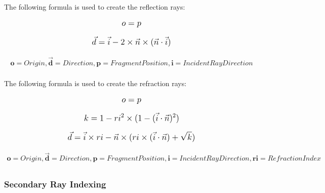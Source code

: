 The following formula is used to create the reflection rays:

\begin{equation}
    \mathlarger{o = p}
\end{equation}

\begin{equation}
    \mathlarger{\vec{d} = \vec{i} - 2 \times \vec{n} \times (\vec{n} \cdot \vec{i})}
\end{equation}

\begin{align*}
    \textbf{o} = Origin, \mathbf{\vec{d}} = Direction,                     
    \textbf{p} = Fragment Position,
    \textbf{i} = Incident Ray Direction\\
\end{align*}


The following formula is used to create the refraction rays:

\begin{equation}
    \mathlarger{o = p}
\end{equation}  

\begin{equation}
    \mathlarger{k = 1 - ri^{2} \times (1 - (\vec{i} \cdot \vec{n})^{2})}
\end{equation}  

\begin{equation}
    \mathlarger{\vec{d} = \vec{i} \times ri - \vec{n} \times (ri \times (\vec{i} \cdot \vec{n}) + \sqrt{k})}
\end{equation}  

\begin{align*}
    \textbf{o} = Origin, \mathbf{\vec{d}} = Direction,                     
    \textbf{p} = Fragment Position,
    \textbf{i} = Incident Ray Direction,
    \textbf{ri} = Refraction Index\\
\end{align*}
            

\pagebreak

\subsubsection{Secondary Ray Indexing}

